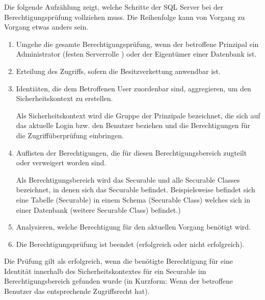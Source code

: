           Die folgende Aufzählung zeigt, welche Schritte der SQL Server bei der
          Berechtigungsprüfung vollziehen muss. Die Reihenfolge kann von Vorgang
          zu Vorgang etwas anders sein.
          \begin{enumerate}
            \item Umgehe die gesamte Berechtigungsprüfung, wenn der betroffene
            Prinzipal ein Administrator (festen Serverrolle
            ) oder der Eigentümer einer Datenbank ist.
            \item Erteilung des Zugriffs, sofern die Besitzverkettung anwendbar
            ist.
            \item Identiäten, die dem Betroffenen User zuordenbar sind,
            aggregieren, um den Sicherheitskontext zu erstellen.
            \begin{merke}
              Als Sicherheitskontext wird die Gruppe der Prinzipale bezeichnet,
              die sich auf das aktuelle Login bzw. den Benutzer beziehen und die
              Berechtigungen für die Zugriffüberprüfung einbringen. 
            \end{merke}
            \item Auflisten der Berechtigungen, die für diesen
            Berechtigungsbereich zugteilt oder verweigert worden sind.
            \begin{merke}
              Als Berechtigungsbereich wird das Securable und alle Securable
              Classes bezeichnet, in denen sich das Securable befindet.
              Beispielsweise befindet sich eine Tabelle (Securable) in einem
              Schema (Securable Class) welches sich in einer Datenbank
              (weitere Securable Class) befindet.)
            \end{merke}
            \item Analysieren, welche Berechtigung für den aktuellen Vorgang
            benötigt wird.
            \item Die Berechtigungsprüfung ist beendet (erfolgreich oder nicht
            erfolgreich).
          \end{enumerate}
          Die Prüfung gilt als erfolgreich, wenn die benötigte Berechtigung für
          eine Identität innerhalb des Sicherheitskontextes für ein Securable im
          Berechtigungsbereich gefunden wurde (in Kurzform: Wenn der betroffene
          Benutzer das entsprechende Zugriffsrecht hat).

